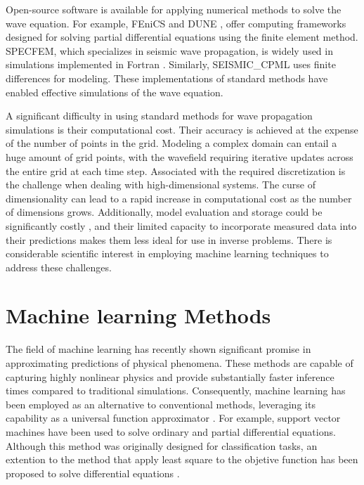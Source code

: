 \documentclass[11pt,twoside]{article}
\begin{document}
Open-source software is available for applying numerical methods to solve the wave equation. For example, FEniCS 
and DUNE \citep{FEniCS,sander_dune_2020}, offer computing frameworks designed for solving partial differential 
equations using the finite element method. SPECFEM, which specializes in seismic wave propagation, is widely used 
in simulations implemented in Fortran \citep{dimitri_komatitsch_2023_10415228,komatitsch_2024_10823181}. Similarly, 
SEISMIC\_CPML \citep{komatitsch_unsplit_2007} uses finite differences for modeling. These implementations of 
standard methods have enabled effective simulations of the wave equation.

A significant difficulty in using standard methods for wave propagation simulations is their computational cost. Their 
accuracy is achieved at the expense of the number of points in the grid. Modeling a complex domain can entail a huge 
amount of grid points, with the wavefield requiring iterative updates across the entire grid at each time step. 
Associated with the required discretization is the challenge when dealing with high-dimensional systems. The curse 
of dimensionality can lead to a rapid increase in computational cost as the number of dimensions grows. Additionally, 
model evaluation and storage could be significantly costly , and their 
limited capacity to incorporate measured data into their predictions makes them less ideal for use in inverse problems. 
There is considerable scientific interest in employing machine learning techniques to address these challenges.

\section{Machine learning Methods}\label{sec:machine_learning_methods}

The field of machine learning has recently shown significant promise in approximating predictions of physical 
phenomena. These methods are capable of capturing highly nonlinear physics and provide substantially faster inference 
times compared to traditional simulations. Consequently, machine learning has been employed as an alternative to 
conventional methods, leveraging its capability as a universal function approximator \citep{hornik_approximation_1991}.
For example, support vector machines have been used to solve ordinary and partial differential equations. Although 
this method was originally designed for classification tasks, an extention to the method that apply least square to 
the objetive function has been proposed to solve differential equations \citep{mehrkanoon_approximate_2012,
mehrkanoon_learning_2015}.
\end{document}
